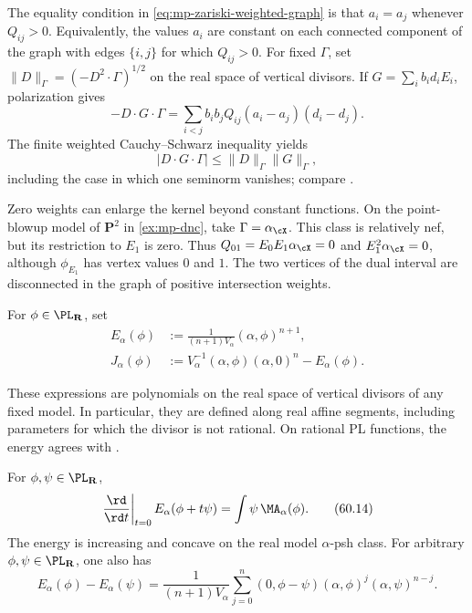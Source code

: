 The equality condition in \eqref{eq:mp-zariski-weighted-graph} is that $a_i=a_j$ whenever $Q_{ij}>0$. Equivalently, the values $a_i$ are constant on each connected component of the graph with edges $\{i,j\}$ for which $Q_{ij}>0$. For fixed $\Gamma$, set $\|D\|_\Gamma=(-D^2\cdot\Gamma)^{1/2}$ on the real space of vertical divisors. If $G=\sum_i b_i d_iE_i$, polarization gives
\[
 -D\cdot G\cdot\Gamma
 =\sum_{i<j}b_i b_jQ_{ij}(a_i-a_j)(d_i-d_j).
\]
The finite weighted Cauchy--Schwarz inequality yields
\[
 |D\cdot G\cdot\Gamma|\leq\|D\|_\Gamma\|G\|_\Gamma,
\]
including the case in which one seminorm vanishes; compare \cite[Remark~4.2.7, pp.~38--39]{MPTropicalV2}.

Zero weights can enlarge the kernel beyond constant functions. On the point-blowup model of $\mathbf P^2$ in \cref{ex:mp-dnc}, take $\Gamma=\alpha_{\cX}$. This class is relatively nef, but its restriction to $E_1$ is zero. Thus $Q_{01}=E_0E_1\alpha_{\cX}=0$ and $E_1^2\alpha_{\cX}=0$, although $\phi_{E_1}$ has vertex values $0$ and $1$. The two vertices of the dual interval are disconnected in the graph of positive intersection weights.

\noindent\begin{minipage}{\linewidth}
\begin{definition}\label{def:mp-energy-j}
For $\phi\in\PL_{\mathbf R}$, set
\[
 \begin{aligned}
 E_\alpha(\phi)
   &:=\frac1{(n+1)V_\alpha}(\alpha,\phi)^{n+1},\\
 J_\alpha(\phi)
   &:=V_\alpha^{-1}(\alpha,\phi)(\alpha,0)^n-E_\alpha(\phi).
 \end{aligned}
\tag{60.13}\label{eq:mp-energy-j}
\]
\end{definition}
\end{minipage}\par

These expressions are polynomials on the real space of vertical divisors
of any fixed model.  In particular, they are defined along real affine
segments, including parameters for which the divisor is not rational.
On rational PL functions, the energy agrees with
\cite[Definition~4.2.9, p.~39]{MPTropicalV2}.

\begin{proposition}\label{prop:mp-energy-first-variation}
For $\phi,\psi\in\PL_{\mathbf R}$,
\[
 \left.\frac{\rd}{\rd t}\right|_{t=0}
 E_\alpha(\phi+t\psi)
       =\int\psi\,\MA_\alpha(\phi).
\tag{60.14}\label{eq:mp-energy-first-variation}
\]
The energy is increasing and concave on the real model $\alpha$-psh
class.  For arbitrary $\phi,\psi\in\PL_{\mathbf R}$, one also has
\[
 E_\alpha(\phi)-E_\alpha(\psi)
 =\frac1{(n+1)V_\alpha}
   \sum_{j=0}^n
   (0,\phi-\psi)(\alpha,\phi)^j(\alpha,\psi)^{n-j}.
\tag{60.15}\label{eq:mp-energy-cocycle}
\]
\end{proposition}

